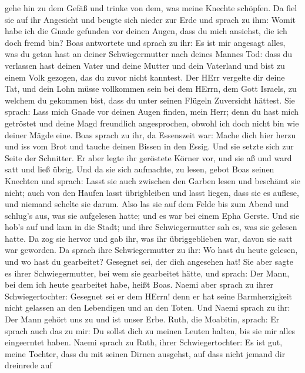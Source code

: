 gehe hin zu dem Gefäß und trinke von dem, was meine Knechte schöpfen.
 Da fiel sie auf ihr Angesicht und beugte sich nieder zur
Erde und sprach zu ihm: Womit habe ich die Gnade gefunden vor deinen
Augen, dass du mich ansiehst, die ich doch fremd bin?  Boas
antwortete und sprach zu ihr: Es ist mir angesagt alles, was du getan
hast an deiner Schwiegermutter nach deines Mannes Tod: dass du verlassen
hast deinen Vater und deine Mutter und dein Vaterland und bist zu einem
Volk gezogen, das du zuvor nicht kanntest.  Der HErr
vergelte dir deine Tat, und dein Lohn müsse vollkommen sein bei dem
HErrn, dem Gott Israels, zu welchem du gekommen bist, dass du unter
seinen Flügeln Zuversicht hättest.  Sie sprach: Lass mich
Gnade vor deinen Augen finden, mein Herr; denn du hast mich getröstet
und deine Magd freundlich angesprochen, obwohl ich doch nicht bin wie
deiner Mägde eine.  Boas sprach zu ihr, da Essenszeit war:
Mache dich hier herzu und iss vom Brot und tauche deinen Bissen in den
Essig. Und sie setzte sich zur Seite der Schnitter. Er aber legte ihr
geröstete Körner vor, und sie aß und ward satt und ließ übrig.
 Und da sie sich aufmachte, zu lesen, gebot Boas seinen
Knechten und sprach: Lasst sie auch zwischen den Garben lesen und
beschämt sie nicht;  auch von den Haufen lasst übrigbleiben
und lasst liegen, dass sie es auflese, und niemand schelte sie darum.
 Also las sie auf dem Felde bis zum Abend und schlug's aus,
was sie aufgelesen hatte; und es war bei einem Epha Gerste.
 Und sie hob's auf und kam in die Stadt; und ihre
Schwiegermutter sah es, was sie gelesen hatte. Da zog sie hervor und gab
ihr, was ihr übriggeblieben war, davon sie satt war geworden.
 Da sprach ihre Schwiegermutter zu ihr: Wo hast du heute
gelesen, und wo hast du gearbeitet? Gesegnet sei, der dich angesehen
hat! Sie aber sagte es ihrer Schwiegermutter, bei wem sie gearbeitet
hätte, und sprach: Der Mann, bei dem ich heute gearbeitet habe, heißt
Boas.  Naemi aber sprach zu ihrer Schwiegertochter:
Gesegnet sei er dem HErrn! denn er hat seine Barmherzigkeit nicht
gelassen an den Lebendigen und an den Toten. Und Naemi sprach zu ihr:
Der Mann gehört uns zu und ist unser Erbe.  Ruth, die
Moabitin, sprach: Er sprach auch das zu mir: Du sollst dich zu meinen
Leuten halten, bis sie mir alles eingeerntet haben.  Naemi
sprach zu Ruth, ihrer Schwiegertochter: Es ist gut, meine Tochter, dass
du mit seinen Dirnen ausgehst, auf dass nicht jemand dir dreinrede auf
